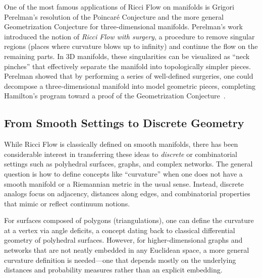 One of the most famous applications of Ricci Flow on manifolds is Grigori Perelman's resolution of the Poincar\'{e} Conjecture and the more general Geometrization Conjecture for three-dimensional manifolds. Perelman's work introduced the notion of \emph{Ricci Flow with surgery}, a procedure to remove singular regions (places where curvature blows up to infinity) and continue the flow on the remaining parts. In 3D manifolds, these singularities can be visualized as ``neck pinches'' that effectively separate the manifold into topologically simpler pieces. Perelman showed that by performing a series of well-defined surgeries, one could decompose a three-dimensional manifold into model geometric pieces, completing Hamilton's program toward a proof of the Geometrization Conjecture~\cite{Perelman}.

\subsection{From Smooth Settings to Discrete Geometry}
While Ricci Flow is classically defined on smooth manifolds, there has been considerable interest in transferring these ideas to \emph{discrete} or combinatorial settings such as polyhedral surfaces, graphs, and complex networks. The general question is how to define concepts like ``curvature'' when one does not have a smooth manifold or a Riemannian metric in the usual sense. Instead, discrete analogs focus on adjacency, distances along edges, and combinatorial properties that mimic or reflect continuum notions.

For surfaces composed of polygons (triangulations), one can define the curvature at a vertex via angle deficits, a concept dating back to classical differential geometry of polyhedral surfaces. However, for higher-dimensional graphs and networks that are not neatly embedded in any Euclidean space, a more general curvature definition is needed—one that depends mostly on the underlying distances and probability measures rather than an explicit embedding. 